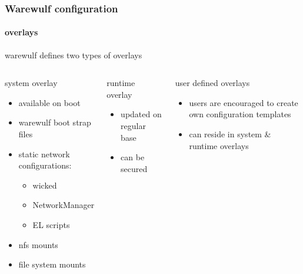 \documentclass[aspectratio=169]{beamer}
\begin{document}
\begin{frame}[fragile]
\frametitle{Warewulf configuration}
\framesubtitle{overlays}
warewulf defines two types of overlays
\begin{columns}
\begin{block}{system overlay}
\begin{itemize}
  \item available on boot
  \item warewulf boot strap files
  \item static network configurations:
  \begin{itemize}
    \item wicked
    \item NetworkManager
    \item EL scripts
  \end{itemize}
  \item nfs mounts
  \item file system mounts
\end{itemize}
\end{block}
\begin{block}{runtime overlay}
\begin{itemize}
  \item updated on regular base
  \item can be secured
\end{itemize}
\end{block}
\begin{block}{user defined overlays}
\begin{itemize}
  \item users are encouraged to create own configuration templates
  \item can reside in system \& runtime overlays
\end{itemize}
\end{block}
\end{columns}
\end{frame}
\end{document}
